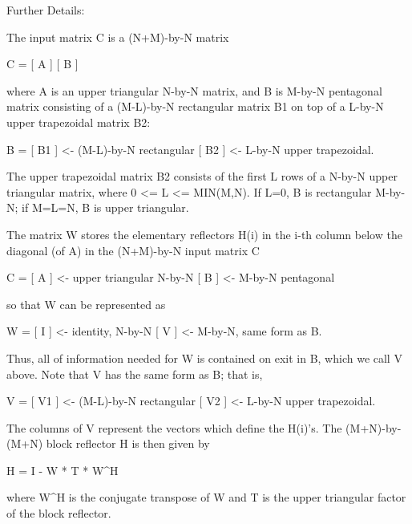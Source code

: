 \begin{DoxyParagraph}{Further Details\+: }
\begin{DoxyVerb}  The input matrix C is a (N+M)-by-N matrix  

               C = [ A ]
                   [ B ]        

  where A is an upper triangular N-by-N matrix, and B is M-by-N pentagonal
  matrix consisting of a (M-L)-by-N rectangular matrix B1 on top of a L-by-N
  upper trapezoidal matrix B2:

               B = [ B1 ]  <- (M-L)-by-N rectangular
                   [ B2 ]  <-     L-by-N upper trapezoidal.

  The upper trapezoidal matrix B2 consists of the first L rows of a
  N-by-N upper triangular matrix, where 0 <= L <= MIN(M,N).  If L=0, 
  B is rectangular M-by-N; if M=L=N, B is upper triangular.  

  The matrix W stores the elementary reflectors H(i) in the i-th column
  below the diagonal (of A) in the (N+M)-by-N input matrix C

               C = [ A ]  <- upper triangular N-by-N
                   [ B ]  <- M-by-N pentagonal

  so that W can be represented as

               W = [ I ]  <- identity, N-by-N
                   [ V ]  <- M-by-N, same form as B.

  Thus, all of information needed for W is contained on exit in B, which
  we call V above.  Note that V has the same form as B; that is, 

               V = [ V1 ] <- (M-L)-by-N rectangular
                   [ V2 ] <-     L-by-N upper trapezoidal.

  The columns of V represent the vectors which define the H(i)'s.  
  The (M+N)-by-(M+N) block reflector H is then given by

               H = I - W * T * W^H

  where W^H is the conjugate transpose of W and T is the upper triangular
  factor of the block reflector.\end{DoxyVerb}
 
\end{DoxyParagraph}
